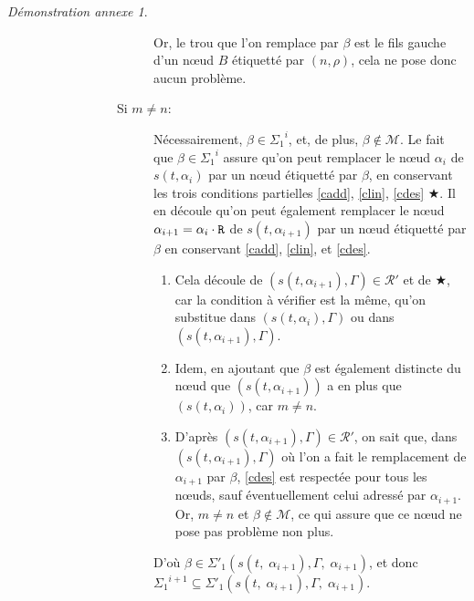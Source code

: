 \documentclass[11pt,a4paper]{article}
\theoremstyle{plain}
\theoremstyle{definition}
\theoremstyle{remark}
\newtheorem{demonstrationappendix}{Démonstration annexe}
\newcommand*{\sequent}{\Gamma}
\newcommand*{\Right}{\textnormal{\texttt{R}}}
\newcommand*{\representationspartial}{\ensuremath{\mathcal{R'}}}
\newcommand*{\highapprox}{\ensuremath{\Sigma_1}}
\newcommand*{\highapproxspec}{\ensuremath{\Sigma'_1}}
\newcommand*{\treesimplify}{\ensuremath{s}}
\begin{document}
\begin{demonstrationappendix}
\begin{description}
\begin{description}
\begin{description}
\begin{description}
                            Or, le trou que l'on remplace par $\beta$ est le fils gauche d'un n\oe ud $B$ étiquetté par $(n, \rho)$, cela ne pose donc aucun problème.
                            
                        \item[Si $m \neq n$:] 
                            Nécessairement, $\beta \in {\highapprox}^{i}$, et, de plus, $\beta \notin \mathcal{M}$. Le fait que $\beta \in {\highapprox}^{i}$ assure qu'on peut remplacer le n\oe ud $\alpha_i$ de $s(t, \alpha_i)$ par un n\oe ud étiquetté par $\beta$, en conservant les trois conditions partielles \ref{cadd}, \ref{clin}, \ref{cdes} $\bigstar$. Il en découle qu'on peut également remplacer le n\oe ud $\alpha_{i+1} = \alpha_i \cdot \Right$ de $s(t, \alpha_{i+1})$ par un n\oe ud étiquetté par $\beta$ en conservant \ref{cadd}, \ref{clin}, et \ref{cdes}.
    
                        \begin{enumerate}
                            \item Cela découle de $(s(t, \alpha_{i+1}), \sequent) \in \representationspartial$ et de $\bigstar$, car la condition à vérifier est la même, qu'on substitue dans $(s(t, \alpha_{i}), \sequent)$ ou dans $(s(t, \alpha_{i+1}), \sequent)$.
    
                            \item Idem, en ajoutant que $\beta$ est également distincte du n\oe ud que $(s(t, \alpha_{i+1}))$ a en plus que $(s(t, \alpha_{i}))$, car $m \neq n$.
    
                            \item D'après $(s(t, \alpha_{i+1}), \sequent) \in \representationspartial$, on sait que, dans $(s(t, \alpha_{i+1}), \sequent)$ où l'on a fait le remplacement de $\alpha_{i+1}$ par $\beta$, \ref{cdes} est respectée pour tous les n\oe uds, sauf éventuellement celui adressé par $\alpha_{i+1}$. Or, $m \neq n$ et $\beta \notin \mathcal{M}$, ce qui assure que ce n\oe ud ne pose pas problème non plus.
                        \end{enumerate}
                        
                        D'où $\beta \in \highapproxspec \left( \treesimplify( t, \; {\alpha}_{i+1} ), \sequent, \; {\alpha}_{i+1} \right)$, et donc ${\highapprox}^{i+1} \subseteq \highapproxspec \left( \treesimplify( t, \; {\alpha}_{i+1} ), \sequent, \; {\alpha}_{i+1} \right)$.
                    \end{description}


\end{description}
\end{description}
\end{description}
\end{demonstrationappendix}
\end{document}
